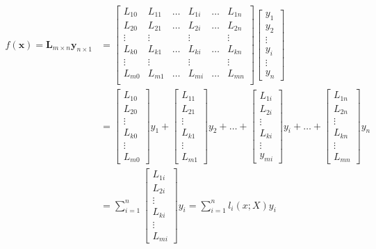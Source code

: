 \documentclass{article}
\begin{document}
		\begin{equation}
		\begin{split}
			f(\boldsymbol{x}) = \boldsymbol{L}_{m\times n}\boldsymbol{y}_{n\times 1}&=
			\begin{bmatrix} 
       			L_{10}&L_{11}&\dots&L_{1i}&\dots&L_{1n}\\
    			L_{20}&L_{21}&\dots&L_{2i}&\dots&L_{2n}\\
    			\vdots&\vdots&     &\vdots&     &\vdots\\
    			L_{k0}&L_{k1}&\dots&L_{ki}&\dots&L_{kn}\\
    			\vdots&\vdots&     &\vdots&     &\vdots\\
    			L_{m0}&L_{m1}&\dots&L_{mi}&\dots&L_{mn}\\
    			\end{bmatrix}
    			\begin{bmatrix} 
    			y_1\\y_2\\\vdots\\y_i\\\vdots\\y_n
    			\end{bmatrix}\\
			&=
			\begin{bmatrix} 
    		L_{10}\\L_{20}\\\vdots\\L_{k0}\\\vdots\\L_{m0}
    		\end{bmatrix}y_1+
    		\begin{bmatrix} 
    		L_{11}\\L_{21}\\\vdots\\L_{k1}\\\vdots\\L_{m1}
    		\end{bmatrix}y_2+\dots+
    		\begin{bmatrix} 
    		L_{1i}\\L_{2i}\\\vdots\\L_{ki}\\\vdots\\y_{mi}
    		\end{bmatrix}y_i+\dots+
    		\begin{bmatrix} 
    		L_{1n}\\L_{2n}\\\vdots\\L_{kn}\\\vdots\\L_{mn}
    		\end{bmatrix}y_n\\
    		&=
    		\sum_{i=1}^{n} 
    		\begin{bmatrix} 
    		L_{1i}\\L_{2i}\\\vdots\\L_{ki}\\\vdots\\L_{mi}
    		\end{bmatrix}y_i
    		=
    		\sum_{i=1}^{n}l_i(x;X)y_i
    	\end{split}
		\end{equation}
\end{document}
